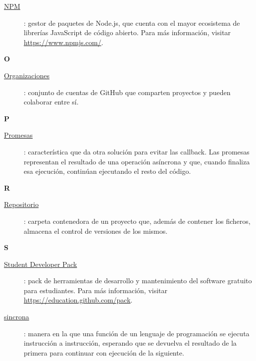 \begin{description}
  \item[\underline{NPM}\label{apend1:npm}]: gestor de paquetes de Node.js, que cuenta con el mayor ecosistema de librerías JavaScript de código abierto. Para más información, visitar {\small \url{https://www.npmjs.com/}}.
  \bigskip
\end{description}

\newpage
{\bfseries {\Huge O}}\label{Apendice1:O}
\bigskip
\bigskip

\begin{description}
  \item[\underline{Organizaciones}\label{apend1:organizacion}]: conjunto de cuentas de GitHub que comparten proyectos y pueden colaborar entre sí.
  \bigskip
\end{description}

\bigskip
{\bfseries {\Huge P}}\label{Apendice1:P}
\bigskip
\bigskip

\begin{description}
  \item[\underline{Promesas}\label{apend1:promesa}]: característica que da otra solución para evitar las callback. Las promesas representan el resultado de una operación asíncrona y que, cuando finaliza esa ejecución, continúan ejecutando el resto del código.
  \bigskip
\end{description}

\bigskip
{\bfseries {\Huge R}}\label{Apendice1:R}
\bigskip
\bigskip

\begin{description}
  \item[\underline{Repositorio}\label{apend1:repositorio}]: carpeta contenedora de un proyecto que, además de contener los ficheros, almacena el control de versiones de los mismos.
  \bigskip
\end{description}

{\bfseries {\Huge S}}\label{Apendice1:S}
\bigskip
\bigskip

\begin{description}
  \item[\underline{Student Developer Pack}\label{apend1:sdp}]: pack de herramientas de desarrollo y mantenimiento del software gratuito para estudiantes. Para más información, visitar {\small \url{https://education.github.com/pack}}.
  \bigskip
\end{description}

\begin{description}
  \item[\underline{sincrona}\label{apend1:sincrona}]: manera en la que una función de un lenguaje de programación se ejecuta instrucción a instrucción, esperando que se devuelva el resultado de la primera para continuar con ejecución de la siguiente.
  \bigskip
\end{description}

